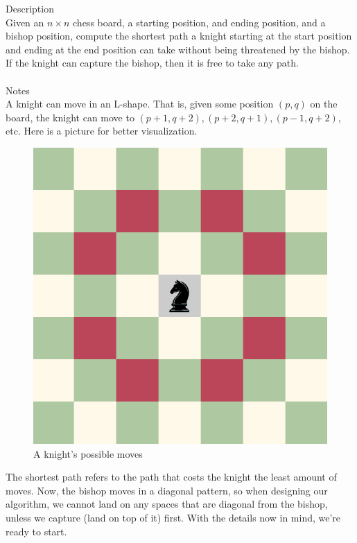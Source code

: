 \documentclass[11pt]{exam}
\begin{document}
{\large Description}\\
Given an $n\times n$ chess board, a starting position, and ending position,
and a bishop position, compute the shortest path a knight starting at the
start position and ending at the end position can take without being
threatened by the bishop. If the knight can capture the bishop, then
it is free to take any path.\\\\
{\large Notes}\\
A knight can move in an L-shape. That is, given some position $(p,q)$ on
the board, the knight can move to $(p+1,q+2), (p+2,q+1), (p-1,q+2)$, etc.
Here is a picture for better visualization.
\begin{figure}[H]
	\centering
	\includegraphics[width=\linewidth]{images/knight_moves.png}
	\caption{A knight's possible moves}
\end{figure}
The shortest path refers to the path that costs the knight the least
amount of moves. Now, the bishop moves in a diagonal pattern, so when
designing our algorithm, we cannot land on any spaces that are diagonal
from the bishop, unless we capture (land on top of it) first.
With the details now in mind, we're ready to start.

\newpage
\end{document}
